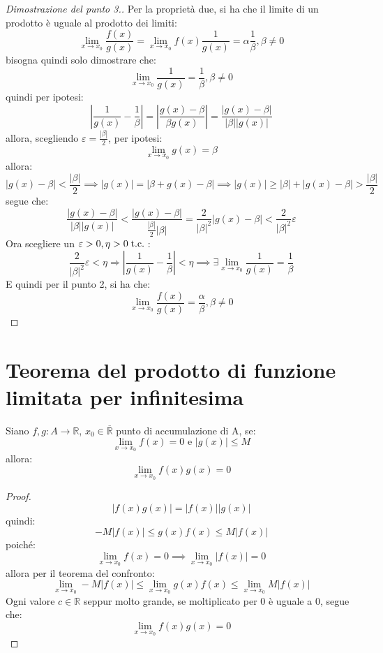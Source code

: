 \documentclass[a4paper,12pt,openright]{book}
\begin{document}
	\begin{proof}[Dimostrazione del punto 3.]
		Per la proprietà due, si ha che il limite di un prodotto è uguale al prodotto dei limiti:
		\[\lim_{x \rightarrow x_0} \frac{f(x)}{g(x)} = \lim_{x \rightarrow x_0} f(x)\frac{1}{g(x)} = \alpha \frac{1}{\beta}, \beta \not = 0\]
		bisogna quindi solo dimostrare che:
		\[\lim_{x \rightarrow x_0} \frac{1}{g(x)} = \frac{1}{\beta}, \beta \not = 0\]
		quindi per ipotesi:
		\[\left|\frac{1}{g(x)} - \frac{1}{\beta}\right| = \left|\frac{g(x) - \beta}{\beta g(x)}\right| = \frac{|g(x) - \beta|}{|\beta||g(x)|}\]
		allora, scegliendo $\varepsilon = \frac{|\beta|}{2}$, per ipotesi:
		\[\lim_{x \rightarrow x_0} g(x) = \beta\]
		allora:
		\[|g(x) - \beta| < \frac{|\beta|}{2} \implies |g(x)| = |\beta + g(x) - \beta| \implies |g(x)| \geq |\beta| + |g(x) - \beta| > \frac{|\beta|}{2}\]
		segue che:
		\[\frac{|g(x) - \beta|}{|\beta||g(x)|} < \frac{|g(x) - \beta|}{\frac{|\beta|}{2} |\beta|} = \frac{2}{|\beta|^2}|g(x) - \beta| < \frac{2}{|\beta|^2} \varepsilon\]
		Ora scegliere un $\varepsilon > 0, \eta > 0 \;\text{t.c.}\;$:
		\[\frac{2}{|\beta|^2} \varepsilon < \eta \Rightarrow |\frac{1}{g(x)} - \frac{1}{\beta}| < \eta \implies \exists \lim_{x \rightarrow x_0} \frac{1}{g(x)} = \frac{1}{\beta}\]
		E quindi per il punto 2, si ha che:
		\[\lim_{x \rightarrow x_0} \frac{f(x)}{g(x)} = \frac{\alpha}{\beta}, \beta \not = 0\]
	\end{proof}
	
	\newpage
	
	\section{Teorema del prodotto di funzione limitata per infinitesima}
	Siano $f,g: A \longrightarrow \mathbb{R}$, $x_0 \in \overline{\mathbb{R}}$ punto di accumulazione di A, se:
	\[\lim_{x \rightarrow x_0} f(x) = 0 \text{ e } |g(x)| \leq M\]
	allora:
	\[\lim_{x \rightarrow x_0} f(x)g(x) = 0\]
	
	\begin{proof}
		\[|f(x)g(x)| = |f(x)||g(x)|\]
		quindi:
		\[-M|f(x)| \leq g(x)f(x) \leq M|f(x)|\]
		poiché:
		\[\lim_{x \rightarrow x_0} f(x) = 0 \implies \lim_{x \rightarrow x_0} |f(x)| = 0\]
		allora per il teorema del confronto:
		\[\lim_{x \rightarrow x_0} -M|f(x)| \leq \lim_{x \rightarrow x_0} g(x)f(x) \leq \lim_{x \rightarrow x_0} M|f(x)|\]
		Ogni valore $c \in \mathbb{R}$ seppur molto grande, se moltiplicato per $0$ è uguale a $0$, segue che:
		\[\lim_{x \rightarrow x_0} f(x) g(x) = 0\]
	\end{proof}	
	
\end{document}
